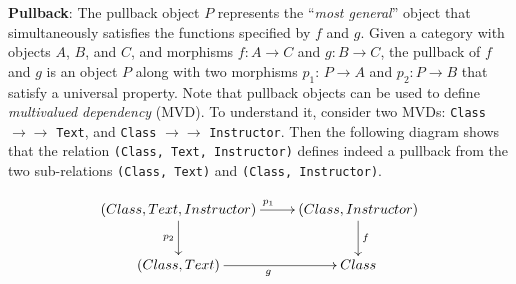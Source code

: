  

 \smallskip
 
  \noindent \textbf{Pullback}:  The pullback object $P$ represents the ``\textit{most general}'' object that simultaneously satisfies the functions specified by $f$ and $g$. Given a category with objects $A$, $B$, and $C$, and morphisms $f: A \to C$ and $g: B \to C$, the pullback of $f$ and $g$ is an object $P$ along with two morphisms $p_1$: $P \to A$ and $p_2: P \to B$ that satisfy a universal property. Note that pullback objects can be used to define \textit{multivalued dependency} (MVD). To understand it, consider two MVDs: \texttt{Class} $\to\to$ \texttt{Text}, and \texttt{Class} $\to\to$ \texttt{Instructor}. Then the following diagram shows that the relation \texttt{(Class, Text, Instructor)} defines indeed a pullback from the two sub-relations \texttt{(Class, Text)} and \texttt{(Class, Instructor)}. 

\[\xymatrix{(Class, Text, Instructor) \ar[r]^{p_1} \ar[d]_{p_2} & (Class, Instructor) \ar[d]^f \\(Class, Text)  \ar[r]_g & Class}\]







